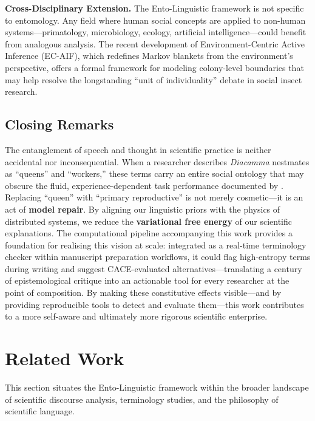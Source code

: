 \documentclass[
]{article}
\numberwithin{equation}{section}
\begin{document}
\textbf{Cross-Disciplinary Extension.} The Ento-Linguistic framework is
not specific to entomology. Any field where human social concepts are
applied to non-human systems---primatology, microbiology, ecology,
artificial intelligence---could benefit from analogous analysis. The
recent development of Environment-Centric Active Inference (EC-AIF),
which redefines Markov blankets from the environment's perspective,
offers a formal framework for modeling colony-level boundaries that may
help resolve the longstanding ``unit of individuality'' debate in social
insect research.

\subsection{Closing Remarks}\label{closing-remarks}

The entanglement of speech and thought in scientific practice is neither
accidental nor inconsequential. When a researcher describes
\emph{Diacamma} nestmates as ``queens'' and ``workers,'' these terms
carry an entire social ontology that may obscure the fluid,
experience-dependent task performance documented by \citet{ravary2007}.
Replacing ``queen'' with ``primary reproductive'' is not merely
cosmetic---it is an act of \textbf{model repair}. By aligning our
linguistic priors with the physics of distributed systems, we reduce the
\textbf{variational free energy} of our scientific explanations. The
computational pipeline accompanying this work provides a foundation for
realising this vision at scale: integrated as a real-time terminology
checker within manuscript preparation workflows, it could flag
high-entropy terms during writing and suggest CACE-evaluated
alternatives---translating a century of epistemological critique into an
actionable tool for every researcher at the point of composition. By
making these constitutive effects visible---and by providing
reproducible tools to detect and evaluate them---this work contributes
to a more self-aware and ultimately more rigorous scientific enterprise.

\newpage

\section{Related Work}\label{sec:related_work}

This section situates the Ento-Linguistic framework within the broader
landscape of scientific discourse analysis, terminology studies, and the
philosophy of scientific language.
\end{document}
